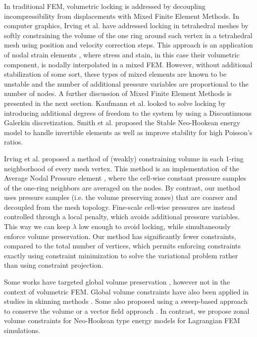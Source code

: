 In traditional FEM, volumetric locking is addressed by decoupling incompressibility from displacements with Mixed Finite Element Methods. 
In computer graphics, Irving et al. \cite{Irving:2007} have addressed locking in tetrahedral meshes by
softly constraining the volume of the one ring around each vertex in a tetrahedral mesh using position
and velocity correction steps. This approach is an application of nodal strain elements \cite{bonet:1998},
where stress and stain, in this case their volumetric component, is nodally interpolated in a mixed FEM. 
However, without additional stabilization of some sort, these types of mixed elements are known to be unstable 
and the number of additional pressure variables are proportional to the number of nodes.
A further discussion of Mixed Finite Element Methods is presented in the next section.
Kaufmann et al. \cite{Kaufmann:2012} looked to solve locking by introducing additional degrees of freedom 
to the system by using a Discontinuous Galerkin discretization. Smith et al. \cite{Smith:2018} proposed 
the Stable Neo-Hookean energy model to handle invertible elements as well as improve stability for high Poisson's ratios.

Irving et al. \cite{Irving:2007} proposed a method of (weakly) constraining volume in
each 1-ring neighborhood of every mesh vertex. This method is an implementation of the 
Average Nodal Pressure element \cite{bonet:1998}, where the cell-wise constant pressure samples of the
one-ring neighbors are averaged on the nodes. By contrast, our method uses pressure samples
(i.e. the volume preserving zones) that are coarser and decoupled from the mesh topology.
Fine-scale cell-wise pressures are instead controlled through a local penalty, which avoids
additional pressure variables.  This way we can keep $\lambda$ low enough to
avoid locking, while simultaneously enforce volume preservation.
Our method has significantly fewer constraints, compared to the total number of vertices, which
permits enforcing constraints exactly using constraint minimization to
solve the variational problem rather than using constraint projection.

Some works have targeted global volume preservation
\cite{Hong:2006,Hirota:2000,Promayon:1996,Diziol:2011}, however not in the context of volumetric
FEM.  Global volume constraints have also been applied in studies in skinning methods
\cite{Rohmer:2009}. Some also proposed using a sweep-based approach to conserve the volume
\cite{Yoon:2006,Angelidi:2004} or a vector field approach \cite{Funck:2007}. In contrast, we propose
zonal volume constraints for Neo-Hookean type energy models for Lagrangian FEM simulations.


